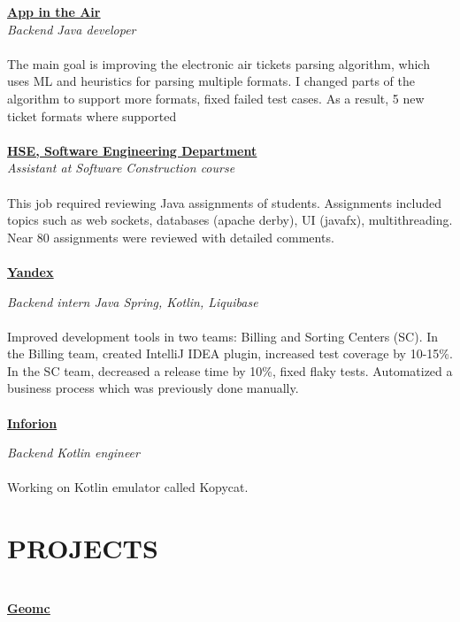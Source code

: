 \documentclass{article}
\begin{document}
\noindent\href{https://www.appintheair.mobi/}{{\textbf{\underline{App in the Air}}}}
\\\noindent\textit{Backend Java developer}
\\\\
\noindent The main goal is improving the electronic air tickets parsing algorithm, which uses ML and heuristics
for parsing multiple formats. I changed parts of the algorithm to support more formats, fixed failed test
cases. As a result, 5 new ticket formats where supported
\\\\
\noindent\href{https://cs.hse.ru/en/dse/}{{\textbf{\underline{HSE, Software Engineering Department}}}}
\\\textit{Assistant at Software Construction course}
\\\\
\noindent  This job required reviewing Java assignments of students. Assignments included topics such as web sockets,
databases (apache derby), UI (javafx), multithreading. Near 80 assignments were reviewed with detailed
comments.
\\\\
\noindent\href{https://yandex.com/}{{\textbf{\underline{Yandex}}}}

\noindent \textit{Backend intern Java Spring, Kotlin, Liquibase}
\\\\
\noindent Improved development tools in two teams: Billing and Sorting Centers (SC). In the Billing team, created
IntelliJ IDEA plugin, increased test coverage by 10-15\%. In the SC team, decreased a release time by
10\%, fixed flaky tests. Automatized a business process which was previously done manually.
\\\\
\noindent\href{https://inforion.ru/}{{\textbf{\underline{Inforion}}}}

\noindent \textit{Backend Kotlin engineer}
\\\\
\noindent Working on Kotlin emulator called Kopycat.
\section*{PROJECTS}
\makebox[530pt]{\rule{570pt}{0.4pt}}\\
\noindent\href{https://45.156.25.18/}{{\textbf{\underline{Geomc}}}}
\end{document}
